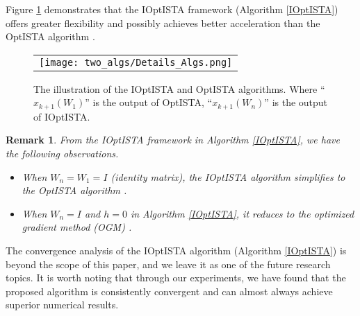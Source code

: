 \documentclass{article}
\newtheorem{remark}{Remark}%
\begin{document}
Figure \ref{details_Alg} demonstrates that the IOptISTA framework (Algorithm \ref{IOptISTA}) offers greater flexibility and possibly achieves better acceleration than the OptISTA algorithm \cite{JangGR23}. 

\begin{figure}[!ht]
\setlength\tabcolsep{2pt}
\centering
\begin{tabular}{c} 
\texttt{[image: two\_algs/Details\_Algs.png]} 
\end{tabular}
\caption{The illustration of the IOptISTA and OptISTA algorithms. Where ``$x_{k+1} (W_{1})$'' is the output of OptISTA, ``$x_{k+1}(W_{n})$'' is the output of IOptISTA.  }
\label{details_Alg}
\end{figure}


\begin{remark}
From the IOptISTA framework in Algorithm \ref{IOptISTA}, we have the following observations.
\begin{itemize}
    \item When $W_{n} = W_{1} = I$ (identity matrix), the IOptISTA algorithm simplifies to the OptISTA algorithm \cite{JangGR23}.
    \item When $W_{n} = I$ and $h = 0$ in Algorithm \ref{IOptISTA}, it reduces to the optimized gradient method (OGM) \cite{KimF16}.
\end{itemize}
\end{remark}
The convergence analysis of the IOptISTA algorithm (Algorithm \ref{IOptISTA}) is beyond the scope of this paper, and we leave it as one of the future research topics. It is worth noting that through our experiments, we have found that the proposed algorithm is consistently convergent and can almost always achieve superior numerical results.
\end{document}
